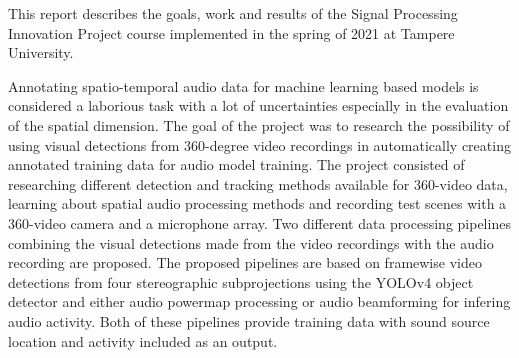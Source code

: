 This report describes the goals, work and results of the Signal Processing Innovation Project course implemented in the spring of 2021 at Tampere University.

Annotating spatio-temporal audio data for machine learning based models is considered a laborious task with a lot of uncertainties especially in the evaluation of the spatial dimension. The goal of the project was to research the possibility of using visual detections from 360-degree video recordings in automatically creating annotated training data for audio model training. The project consisted of researching different detection and tracking methods available for 360-video data, learning about spatial audio processing methods and recording test scenes with a 360-video camera and a microphone array. Two different data processing pipelines combining the visual detections made from the video recordings with the audio recording are proposed. The proposed pipelines are based on framewise video detections from four stereographic subprojections using the YOLOv4 object detector and either audio powermap processing or audio beamforming for infering audio activity. Both of these pipelines provide training data with sound source location and activity included as an output.

